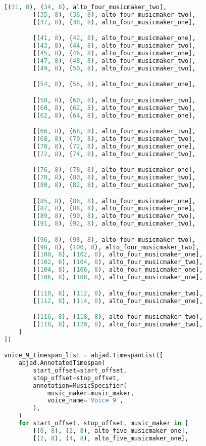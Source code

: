 \begin{lstlisting}[language=Python, caption=Invocation Source Code]
        [(31, 8), (34, 8), alto_four_musicmaker_two],
        [(35, 8), (36, 8), alto_four_musicmaker_two],
        [(37, 8), (38, 8), alto_four_musicmaker_one],

        [(41, 8), (42, 8), alto_four_musicmaker_one],
        [(43, 8), (44, 8), alto_four_musicmaker_two],
        [(45, 8), (46, 8), alto_four_musicmaker_one],
        [(47, 8), (48, 8), alto_four_musicmaker_two],
        [(49, 8), (50, 8), alto_four_musicmaker_two],

        [(54, 8), (56, 8), alto_four_musicmaker_one],

        [(58, 8), (60, 8), alto_four_musicmaker_two],
        [(60, 8), (62, 8), alto_four_musicmaker_two],
        [(62, 8), (64, 8), alto_four_musicmaker_one],

        [(66, 8), (68, 8), alto_four_musicmaker_two],
        [(68, 8), (70, 8), alto_four_musicmaker_two],
        [(70, 8), (72, 8), alto_four_musicmaker_one],
        [(72, 8), (74, 8), alto_four_musicmaker_two],

        [(76, 8), (78, 8), alto_four_musicmaker_one],
        [(78, 8), (80, 8), alto_four_musicmaker_two],
        [(80, 8), (82, 8), alto_four_musicmaker_two],

        [(85, 8), (86, 8), alto_four_musicmaker_one],
        [(87, 8), (88, 8), alto_four_musicmaker_one],
        [(89, 8), (90, 8), alto_four_musicmaker_two],
        [(91, 8), (92, 8), alto_four_musicmaker_two],

        [(96, 8), (98, 8), alto_four_musicmaker_two],
        [(98, 8), (100, 8), alto_four_musicmaker_two],
        [(100, 8), (102, 8), alto_four_musicmaker_one],
        [(102, 8), (104, 8), alto_four_musicmaker_two],
        [(104, 8), (106, 8), alto_four_musicmaker_one],
        [(106, 8), (108, 8), alto_four_musicmaker_one],

        [(110, 8), (112, 8), alto_four_musicmaker_two],
        [(112, 8), (114, 8), alto_four_musicmaker_one],

        [(116, 8), (118, 8), alto_four_musicmaker_two],
        [(118, 8), (120, 8), alto_four_musicmaker_two],
    ]
])

voice_9_timespan_list = abjad.TimespanList([
    abjad.AnnotatedTimespan(
        start_offset=start_offset,
        stop_offset=stop_offset,
        annotation=MusicSpecifier(
            music_maker=music_maker,
            voice_name='Voice 9',
        ),
    )
    for start_offset, stop_offset, music_maker in [
        [(0, 8), (2, 8), alto_five_musicmaker_one],
        [(2, 8), (4, 8), alto_five_musicmaker_one],



\end{lstlisting}
